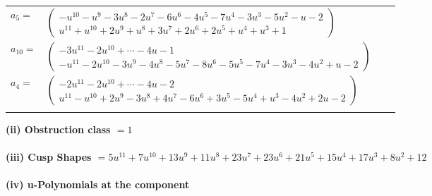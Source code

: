 \documentclass[1p]{elsarticle_modified}
\theoremstyle{definition}
\begin{document}
\begin{tabular}{m{7pt} m{180pt} m{7pt} m{180pt} }
\flushright $a_{5}=$&$\begin{pmatrix}- u^{10}- u^9-3 u^8-2 u^7-6 u^6-4 u^5-7 u^4-3 u^3-5 u^2- u-2\\u^{11}+u^{10}+2 u^9+u^8+3 u^7+2 u^6+2 u^5+u^4+u^3+1\end{pmatrix}$ \\
\flushright $a_{10}=$&$\begin{pmatrix}-3 u^{11}-2 u^{10}+\cdots-4 u-1\\- u^{11}-2 u^{10}-3 u^9-4 u^8-5 u^7-8 u^6-5 u^5-7 u^4-3 u^3-4 u^2+u-2\end{pmatrix}$ \\
\flushright $a_{4}=$&$\begin{pmatrix}-2 u^{11}-2 u^{10}+\cdots-4 u-2\\u^{11}- u^{10}+2 u^9-3 u^8+4 u^7-6 u^6+3 u^5-5 u^4+u^3-4 u^2+2 u-2\end{pmatrix}$\\&\end{tabular}
\flushleft \textbf{(ii) Obstruction class $= 1$}\\~\\
\flushleft \textbf{(iii) Cusp Shapes $= 5 u^{11}+7 u^{10}+13 u^9+11 u^8+23 u^7+23 u^6+21 u^5+15 u^4+17 u^3+8 u^2+12$}\\~\\
\newpage\renewcommand{\arraystretch}{1}
\flushleft \textbf{(iv) u-Polynomials at the component}\newline \\
\end{document}
